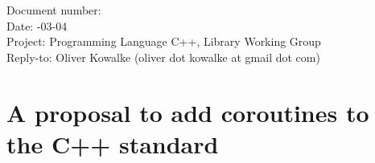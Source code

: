 \documentclass[10pt,a4paper,english]{proc}
\begin{document}
\onecolumn

\small
\begin{tabbing}
    Document number: \=  \\
    Date:            -03-04 \\
    Project:         \> Programming Language C++, Library Working Group \\
    Reply-to:        \> Oliver Kowalke (oliver dot kowalke at gmail dot com)
\end{tabbing}

\section*{A proposal to add coroutines to the C++ standard}


\tableofcontents











\end{document}
